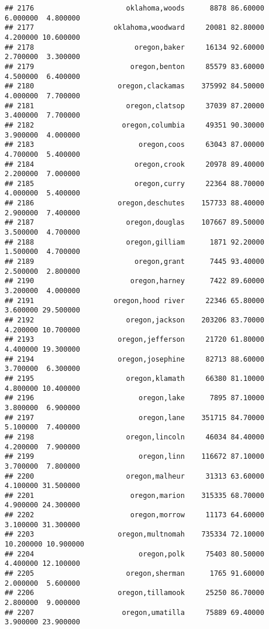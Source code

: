 \documentclass[
]{article}
\begin{document}
\begin{verbatim}
## 2176                      oklahoma,woods      8878 86.60000  6.000000  4.800000
## 2177                   oklahoma,woodward     20081 82.80000  4.200000 10.600000
## 2178                        oregon,baker     16134 92.60000  2.700000  3.300000
## 2179                       oregon,benton     85579 83.60000  4.500000  6.400000
## 2180                    oregon,clackamas    375992 84.50000  4.000000  7.700000
## 2181                      oregon,clatsop     37039 87.20000  3.400000  7.700000
## 2182                     oregon,columbia     49351 90.30000  3.900000  4.000000
## 2183                         oregon,coos     63043 87.00000  4.700000  5.400000
## 2184                        oregon,crook     20978 89.40000  2.200000  7.000000
## 2185                        oregon,curry     22364 88.70000  4.000000  5.400000
## 2186                    oregon,deschutes    157733 88.40000  2.900000  7.400000
## 2187                      oregon,douglas    107667 89.50000  3.500000  4.700000
## 2188                      oregon,gilliam      1871 92.20000  1.500000  4.700000
## 2189                        oregon,grant      7445 93.40000  2.500000  2.800000
## 2190                       oregon,harney      7422 89.60000  3.200000  4.000000
## 2191                   oregon,hood river     22346 65.80000  3.600000 29.500000
## 2192                      oregon,jackson    203206 83.70000  4.200000 10.700000
## 2193                    oregon,jefferson     21720 61.80000  4.400000 19.300000
## 2194                    oregon,josephine     82713 88.60000  3.700000  6.300000
## 2195                      oregon,klamath     66380 81.10000  4.800000 10.400000
## 2196                         oregon,lake      7895 87.10000  3.800000  6.900000
## 2197                         oregon,lane    351715 84.70000  5.100000  7.400000
## 2198                      oregon,lincoln     46034 84.40000  4.200000  7.900000
## 2199                         oregon,linn    116672 87.10000  3.700000  7.800000
## 2200                      oregon,malheur     31313 63.60000  4.100000 31.500000
## 2201                       oregon,marion    315335 68.70000  4.900000 24.300000
## 2202                       oregon,morrow     11173 64.60000  3.100000 31.300000
## 2203                    oregon,multnomah    735334 72.10000 10.200000 10.900000
## 2204                         oregon,polk     75403 80.50000  4.400000 12.100000
## 2205                      oregon,sherman      1765 91.60000  2.000000  5.600000
## 2206                    oregon,tillamook     25250 86.70000  2.800000  9.000000
## 2207                     oregon,umatilla     75889 69.40000  3.900000 23.900000

\end{verbatim}
\end{document}
